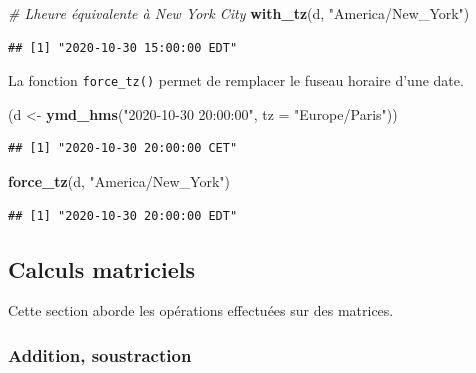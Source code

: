 \documentclass[
  11pt,
]{book}
\newenvironment{Shaded}{\begin{snugshade}}{\end{snugshade}}
\newcommand{\CommentTok}[1]{\textcolor[rgb]{0.56,0.35,0.01}{\textit{#1}}}
\newcommand{\DataTypeTok}[1]{\textcolor[rgb]{0.13,0.29,0.53}{#1}}
\newcommand{\KeywordTok}[1]{\textcolor[rgb]{0.13,0.29,0.53}{\textbf{#1}}}
\newcommand{\NormalTok}[1]{#1}
\newcommand{\StringTok}[1]{\textcolor[rgb]{0.31,0.60,0.02}{#1}}
\numberwithin{equation}{section}
\numberwithin{countremarque}{section}
\begin{document}
\begin{Shaded}
\begin{Highlighting}[]
\CommentTok{\# L\textquotesingle{}heure équivalente à New York City}
\KeywordTok{with\_tz}\NormalTok{(d, }\StringTok{"America/New\_York"}\NormalTok{)}
\end{Highlighting}
\end{Shaded}

\begin{lstlisting}
## [1] "2020-10-30 15:00:00 EDT"
\end{lstlisting}

La fonction \texttt{force\_tz()} permet de remplacer le fuseau horaire d'une date.

\begin{Shaded}
\begin{Highlighting}[]
\NormalTok{(d \textless{}{-}}\StringTok{ }\KeywordTok{ymd\_hms}\NormalTok{(}\StringTok{"2020{-}10{-}30 20:00:00"}\NormalTok{, }\DataTypeTok{tz =} \StringTok{"Europe/Paris"}\NormalTok{))}
\end{Highlighting}
\end{Shaded}

\begin{lstlisting}
## [1] "2020-10-30 20:00:00 CET"
\end{lstlisting}

\begin{Shaded}
\begin{Highlighting}[]
\KeywordTok{force\_tz}\NormalTok{(d, }\StringTok{"America/New\_York"}\NormalTok{)}
\end{Highlighting}
\end{Shaded}

\begin{lstlisting}
## [1] "2020-10-30 20:00:00 EDT"
\end{lstlisting}

\hypertarget{calculs-matriciels}{%
\subsection{Calculs matriciels}\label{calculs-matriciels}}

Cette section aborde les opérations effectuées sur des matrices.

\hypertarget{addition-soustraction}{%
\subsubsection{Addition, soustraction}\label{addition-soustraction}}
\end{document}
